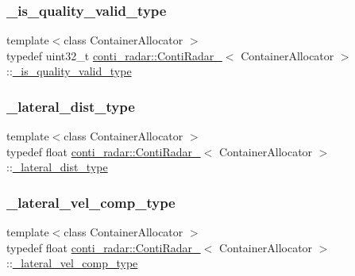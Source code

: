 \subsubsection{\texorpdfstring{\+\_\+is\+\_\+quality\+\_\+valid\+\_\+type}{\_is\_quality\_valid\_type}}
{\footnotesize\ttfamily template$<$class Container\+Allocator $>$ \\
typedef uint32\+\_\+t \hyperlink{structconti__radar_1_1ContiRadar__}{conti\+\_\+radar\+::\+Conti\+Radar\+\_\+}$<$ Container\+Allocator $>$\+::\hyperlink{structconti__radar_1_1ContiRadar___a03d5186874dd855dae68a07e423d9825}{\+\_\+is\+\_\+quality\+\_\+valid\+\_\+type}}

\mbox{\label{structconti__radar_1_1ContiRadar___a2c5d5de6c5ec7dc7b53d84802b54d522}} 
\subsubsection{\texorpdfstring{\+\_\+lateral\+\_\+dist\+\_\+type}{\_lateral\_dist\_type}}
{\footnotesize\ttfamily template$<$class Container\+Allocator $>$ \\
typedef float \hyperlink{structconti__radar_1_1ContiRadar__}{conti\+\_\+radar\+::\+Conti\+Radar\+\_\+}$<$ Container\+Allocator $>$\+::\hyperlink{structconti__radar_1_1ContiRadar___a2c5d5de6c5ec7dc7b53d84802b54d522}{\+\_\+lateral\+\_\+dist\+\_\+type}}

\mbox{\label{structconti__radar_1_1ContiRadar___af4091d74d21fafb513e0815764836f98}} 
\subsubsection{\texorpdfstring{\+\_\+lateral\+\_\+vel\+\_\+comp\+\_\+type}{\_lateral\_vel\_comp\_type}}
{\footnotesize\ttfamily template$<$class Container\+Allocator $>$ \\
typedef float \hyperlink{structconti__radar_1_1ContiRadar__}{conti\+\_\+radar\+::\+Conti\+Radar\+\_\+}$<$ Container\+Allocator $>$\+::\hyperlink{structconti__radar_1_1ContiRadar___af4091d74d21fafb513e0815764836f98}{\+\_\+lateral\+\_\+vel\+\_\+comp\+\_\+type}}

